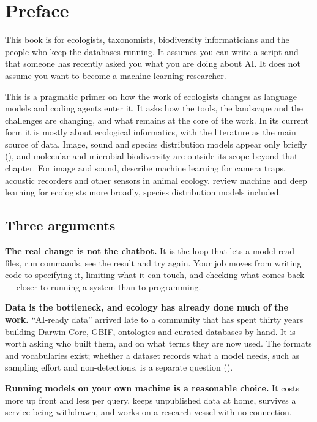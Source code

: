 \chapter*{Preface}

This book is for ecologists, taxonomists, biodiversity informaticians and the
people who keep the databases running. It assumes you can write a script and
that someone has recently asked you what you are doing about AI. It does not
assume you want to become a machine learning researcher.

This is a pragmatic primer on how the work of ecologists changes as language
models and coding agents enter it. It asks how the tools, the landscape and
the challenges are changing, and what remains at the core of the work. In its
current form it is mostly about ecological informatics, with the literature as
the main source of data. Image, sound and species distribution models appear
only briefly (), and molecular and microbial biodiversity
are outside its scope beyond that chapter. For image and sound,
\textcite{tuia2022perspectives} describe machine learning for camera traps,
acoustic recorders and other sensors in animal ecology.
\textcite{pichler2023review} review machine and deep learning for ecologists
more broadly, species distribution models included.

\section*{Three arguments}

\textbf{The real change is not the chatbot.} It is the loop that lets a model
read files, run commands, see the result and try again. Your job moves from
writing code to specifying it, limiting what it can touch, and checking what
comes back --- closer to running a system than to programming.

\textbf{Data is the bottleneck, and ecology has already done much of the work.}
``AI-ready data'' arrived late to a community that has spent thirty years
building Darwin Core, GBIF, ontologies and curated databases by hand. It is worth
asking who built them, and on what terms they are now used. The formats and
vocabularies exist; whether a dataset records what a model needs, such as
sampling effort and non-detections, is a separate question
().

\textbf{Running models on your own machine is a reasonable choice.} It costs
more up front and less per query, keeps unpublished data at home, survives a
service being withdrawn, and works on a research vessel with no connection.


